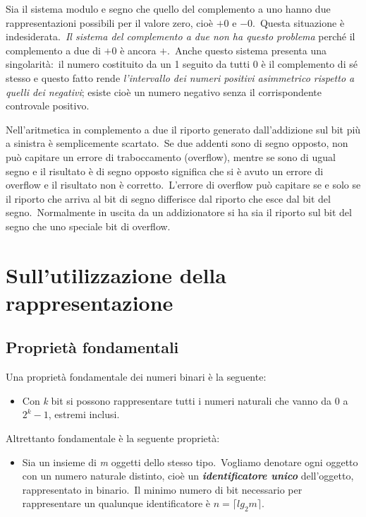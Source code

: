 \noindent Sia il sistema modulo e segno che quello del complemento a uno hanno due rappresentazioni possibili per il valore zero, cioè $+0$ e $-0$.\
Questa situazione è indesiderata.\
\textit{Il sistema del complemento a due non ha questo problema} perché il complemento a due di $+0$ è ancora $+$.\
Anche questo sistema presenta una singolarità:\ il numero costituito da un 1 seguito da tutti 0 è il complemento di sé stesso e questo fatto rende \textit{l'intervallo dei numeri positivi asimmetrico rispetto a quelli dei negativi}; esiste cioè un numero negativo senza il corrispondente controvale positivo.

Nell'aritmetica in complemento a due il riporto generato dall'addizione sul bit più a sinistra è semplicemente scartato.\
Se due addenti sono di segno opposto, non può capitare un errore di traboccamento (overflow), mentre se sono di ugual segno e il risultato è di segno opposto significa che si è avuto un errore di overflow e il risultato non è corretto.\
L'errore di overflow può capitare se e solo se il riporto che arriva al bit di segno differisce dal riporto che esce dal bit del segno.\
Normalmente in uscita da un addizionatore si ha sia il riporto sul bit del segno che uno speciale bit di overflow.

\section{Sull'utilizzazione della rappresentazione}

\subsection{Proprietà fondamentali}

Una proprietà fondamentale dei numeri binari è la seguente:

\begin{itemize}
    \item Con \textit{k} bit si possono rappresentare tutti i numeri naturali che vanno da 0 a $2^k - 1$, estremi inclusi.
\end{itemize}

\noindent Altrettanto fondamentale è la seguente proprietà:

\begin{itemize}
    \item Sia un insieme di \textit{m} oggetti dello stesso tipo.\ Vogliamo denotare ogni oggetto con un numero naturale distinto, cioè un \textbf{\textit{identificatore unico}} dell'oggetto, rappresentato in binario.\ Il minimo numero di bit necessario per rappresentare un qualunque identificatore è $n = \lceil lg_2m \rceil $.
\end{itemize}

